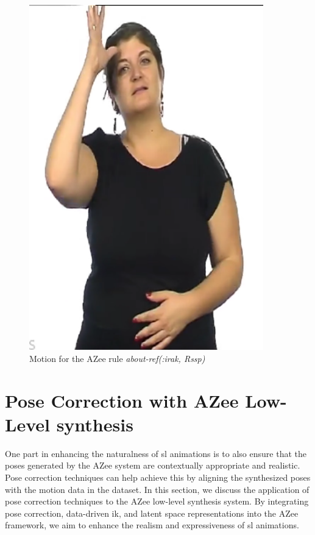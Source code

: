 \documentclass[../../main.tex]{subfiles}
\begin{document}
\begin{figure}
    \centering \includegraphics[width = 4in]{chapters/intermediate_blocks_pose_correction/images/about_ref_irak.png}
    \caption{Motion for the AZee rule \emph{about-ref(:irak, Rssp)}}
    \label{fig:about_ref_irak}
\end{figure}

\section{Pose Correction with AZee Low-Level synthesis}
\label{ch:intermediate_blocks_pose_correction:pose_correction_with_azee}

One part in enhancing the naturalness of \gls{sl} animations is to also ensure that the poses generated by the AZee system are contextually appropriate and realistic. Pose correction techniques can help achieve this by aligning the synthesized poses with the motion data in the dataset. In this section, we discuss the application of pose correction techniques to the AZee low-level synthesis system. By integrating pose correction, data-driven \gls{ik}, and latent space representations into the AZee framework, we aim to enhance the realism and expressiveness of \gls{sl} animations.
\end{document}
